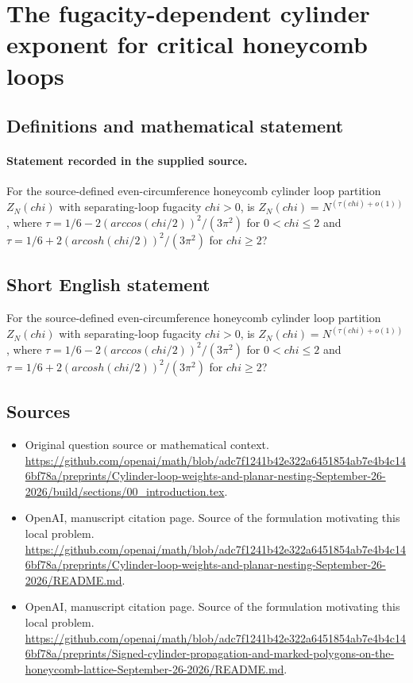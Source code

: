 \documentclass[11pt]{article}
\begin{document}
\section*{The fugacity-dependent cylinder exponent for critical honeycomb loops}\label{statement}
\subsection{Definitions and mathematical statement}
\paragraph{Statement recorded in the supplied source.}
For the source-defined even-circumference honeycomb cylinder loop partition $Z_N(chi)$ with separating-loop fugacity $chi>0$, is $Z_N(chi)=N^(\tau (chi)+o(1))$, where $\tau =1/6-2(arccos(chi/2))^2/(3\pi ^2)$ for $0<chi\leq 2$ and $\tau =1/6+2(arcosh(chi/2))^2/(3\pi ^2)$ for $chi\geq 2$?
\subsection{Short English statement}
For the source-defined even-circumference honeycomb cylinder loop partition $Z_N(chi)$ with separating-loop fugacity $chi>0$, is $Z_N(chi)=N^(\tau (chi)+o(1))$, where $\tau =1/6-2(arccos(chi/2))^2/(3\pi ^2)$ for $0<chi\leq 2$ and $\tau =1/6+2(arcosh(chi/2))^2/(3\pi ^2)$ for $chi\geq 2$?
\subsection{Sources}
\begin{itemize}
\item[S1] Original question source or mathematical context.
\url{https://github.com/openai/math/blob/adc7f1241b42e322a6451854ab7e4b4c146bf78a/preprints/Cylinder-loop-weights-and-planar-nesting-September-26-2026/build/sections/00_introduction.tex}.
\item[S2] OpenAI, manuscript citation page. Source of the formulation motivating this local problem.
\url{https://github.com/openai/math/blob/adc7f1241b42e322a6451854ab7e4b4c146bf78a/preprints/Cylinder-loop-weights-and-planar-nesting-September-26-2026/README.md}.
\item[S3] OpenAI, manuscript citation page. Source of the formulation motivating this local problem.
\url{https://github.com/openai/math/blob/adc7f1241b42e322a6451854ab7e4b4c146bf78a/preprints/Signed-cylinder-propagation-and-marked-polygons-on-the-honeycomb-lattice-September-26-2026/README.md}.
\end{itemize}
\end{document}
